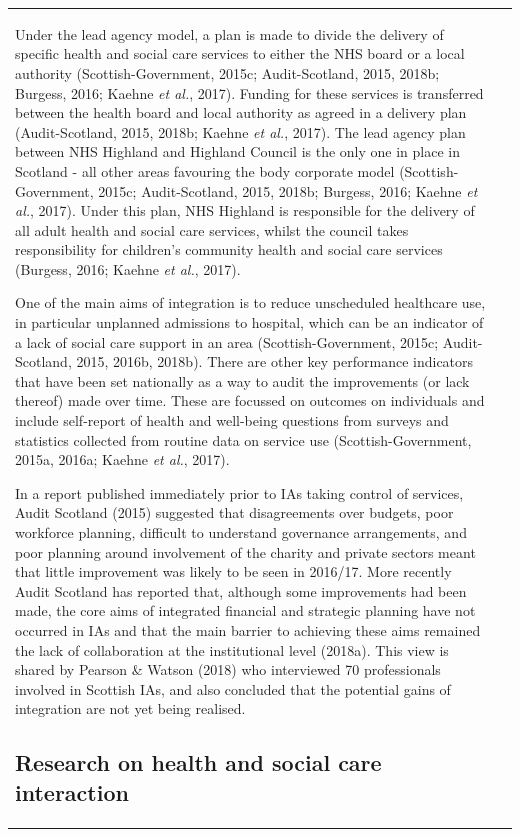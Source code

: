 \documentclass[12pt,a4paper,oneside,table]{report}
\begin{document}
\begin{tabular}[t]{ll}
Under the lead agency model, a plan is made to divide the delivery of
specific health and social care services to either the NHS board or a
local authority (Scottish-Government, 2015c; Audit-Scotland, 2015,
2018b; Burgess, 2016; Kaehne \emph{et al.}, 2017). Funding for these
services is transferred between the health board and local authority as
agreed in a delivery plan (Audit-Scotland, 2015, 2018b; Kaehne \emph{et
al.}, 2017). The lead agency plan between NHS Highland and Highland
Council is the only one in place in Scotland - all other areas favouring
the body corporate model (Scottish-Government, 2015c; Audit-Scotland,
2015, 2018b; Burgess, 2016; Kaehne \emph{et al.}, 2017). Under this
plan, NHS Highland is responsible for the delivery of all adult health
and social care services, whilst the council takes responsibility for
children's community health and social care services (Burgess, 2016;
Kaehne \emph{et al.}, 2017).

One of the main aims of integration is to reduce unscheduled healthcare
use, in particular unplanned admissions to hospital, which can be an
indicator of a lack of social care support in an area
(Scottish-Government, 2015c; Audit-Scotland, 2015, 2016b, 2018b). There
are other key performance indicators that have been set nationally as a
way to audit the improvements (or lack thereof) made over time. These
are focussed on outcomes on individuals and include self-report of
health and well-being questions from surveys and statistics collected
from routine data on service use (Scottish-Government, 2015a, 2016a;
Kaehne \emph{et al.}, 2017).

In a report published immediately prior to IAs taking control of
services, Audit Scotland (2015) suggested that disagreements over
budgets, poor workforce planning, difficult to understand governance
arrangements, and poor planning around involvement of the charity and
private sectors meant that little improvement was likely to be seen in
2016/17. More recently Audit Scotland has reported that, although some
improvements had been made, the core aims of integrated financial and
strategic planning have not occurred in IAs and that the main barrier to
achieving these aims remained the lack of collaboration at the
institutional level (2018a). This view is shared by Pearson \& Watson
(2018) who interviewed 70 professionals involved in Scottish IAs, and
also concluded that the potential gains of integration are not yet being
realised.

\subsection{Research on health and social care interaction}\label{subsec:research}


\end{tabular}
\end{document}
